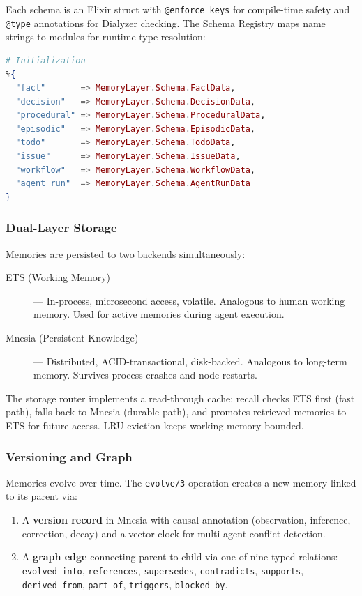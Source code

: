 \documentclass[12pt,a4paper]{article}
\theoremstyle{definition}
\begin{document}
Each schema is an Elixir struct with \texttt{@enforce\_keys} for compile-time
safety and \texttt{@type} annotations for Dialyzer checking. The Schema Registry
maps name strings to modules for runtime type resolution:

\begin{lstlisting}[language=elixir, caption={Schema Registry: name to module resolution}]
# Initialization
%{
  "fact"       => MemoryLayer.Schema.FactData,
  "decision"   => MemoryLayer.Schema.DecisionData,
  "procedural" => MemoryLayer.Schema.ProceduralData,
  "episodic"   => MemoryLayer.Schema.EpisodicData,
  "todo"       => MemoryLayer.Schema.TodoData,
  "issue"      => MemoryLayer.Schema.IssueData,
  "workflow"   => MemoryLayer.Schema.WorkflowData,
  "agent_run"  => MemoryLayer.Schema.AgentRunData
}
\end{lstlisting}

\subsubsection{Dual-Layer Storage}

Memories are persisted to two backends simultaneously:

\begin{description}
  \item[ETS (Working Memory)] --- In-process, microsecond access, volatile.
    Analogous to human working memory. Used for active memories during
    agent execution.
  \item[Mnesia (Persistent Knowledge)] --- Distributed, ACID-transactional,
    disk-backed. Analogous to long-term memory. Survives process crashes
    and node restarts.
\end{description}

The storage router implements a read-through cache: recall checks ETS first
(fast path), falls back to Mnesia (durable path), and promotes retrieved
memories to ETS for future access. LRU eviction keeps working memory bounded.

\subsubsection{Versioning and Graph}

Memories evolve over time. The \texttt{evolve/3} operation creates a new
memory linked to its parent via:

\begin{enumerate}
  \item A \textbf{version record} in Mnesia with causal annotation
        (observation, inference, correction, decay) and a vector clock
        for multi-agent conflict detection.
  \item A \textbf{graph edge} connecting parent to child via one of nine
        typed relations: \texttt{evolved\_into}, \texttt{references},
        \texttt{supersedes}, \texttt{contradicts}, \texttt{supports},
        \texttt{derived\_from}, \texttt{part\_of}, \texttt{triggers},
        \texttt{blocked\_by}.
\end{enumerate}
\end{document}
